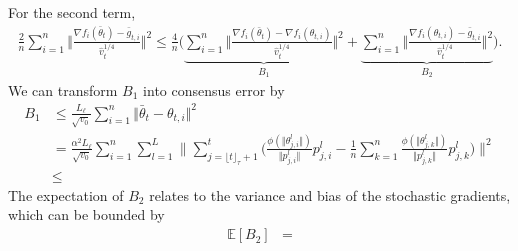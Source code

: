 \documentclass{article}
\begin{document}
For the second term,
\begin{align}
    \frac{2}{n}\sum_{i=1}^n\Vert \frac{\nabla f_i(\bar\theta_t)-\bar g_{t,i}}{\hat v_t^{1/4}} \Vert^2 \leq \frac{4}{n}\Big( \underbrace{\sum_{i=1}^n \Vert \frac{\nabla f_i(\bar\theta_t)-\nabla f_i(\theta_{t,i})}{\hat v_t^{1/4}} \Vert^2}_{B_1} + \underbrace{ \sum_{i=1}^n\Vert \frac{\nabla f_i(\theta_{t,i})-\bar g_{t,i}}{\hat v_t^{1/4}} \Vert^2}_{B_2} \Big).
\end{align}
We can transform $B_1$ into consensus error by
\begin{align}
    B_1&\leq \frac{L_\ell}{\sqrt{v_0}}\sum_{i=1}^n \Vert \bar\theta_t - \theta_{t,i}\Vert^2\\
    &=\frac{\alpha^2 L_\ell}{\sqrt{v_0}}\sum_{i=1}^n\sum_{l=1}^L \| \sum_{j=\lfloor t \rfloor_\tau+1}^t \Big( \frac{\phi(\Vert \theta_{j,i}^l\Vert)}{\Vert p_{j,i}^l\Vert}p_{j,i}^l-\frac{1}{n}\sum_{k=1}^n \frac{\phi(\Vert \theta_{j,k}^l\Vert)}{\Vert p_{j,k}^l\Vert}p_{j,k}^l \Big) \|^2\\
    &\leq 
\end{align}
The expectation of $B_2$ relates to the variance and bias of the stochastic gradients, which can be bounded by
\begin{align*}
    \mathbb E[B_2]&= 
\end{align*}

\end{document}
